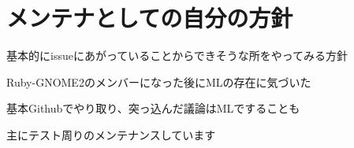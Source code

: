 \section{メンテナとしての自分の方針}

\begin{frame}
\begin{itemize}
{\Large
\item 基本的にissueにあがっていることからできそうな所をやってみる方針
\item Ruby-GNOME2のメンバーになった後にMLの存在に気づいた
\item 基本Githubでやり取り、突っ込んだ議論はMLですることも
\item 主にテスト周りのメンテナンスしています
}
\end{itemize}
\end{frame}
